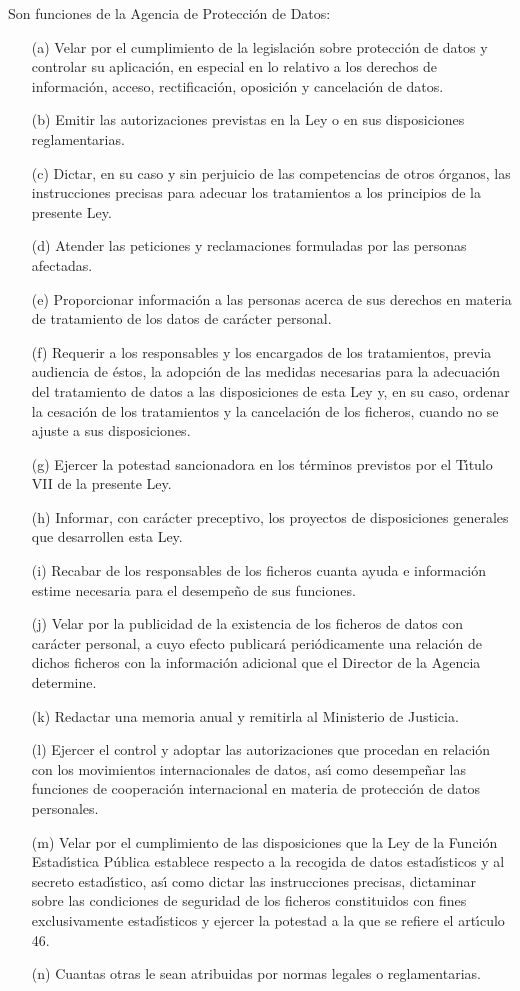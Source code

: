 Son funciones de la Agencia de Protecci\'on de Datos:
\begin{itemize}
\item [(a)] Velar por el cumplimiento de la legislaci\'on sobre protecci\'on de 
datos y controlar su aplicaci\'on, en especial en lo relativo a los derechos de 
informaci\'on, acceso, rectificaci\'on, oposici\'on y cancelaci\'on de datos.
\item [(b)] Emitir las autorizaciones previstas en la Ley o en sus disposiciones
reglamentarias.
\item [(c)] Dictar, en su caso y sin perjuicio de las competencias de otros 
\'organos, las instrucciones precisas para adecuar los tratamientos a los 
principios de la presente Ley.
\item [(d)] Atender las peticiones y reclamaciones formuladas por las personas 
afectadas.
\item [(e)] Proporcionar informaci\'on a las personas acerca de sus derechos en 
materia de tratamiento de los datos de car\'acter personal.
\item [(f)] Requerir a los responsables y los encargados de los tratamientos, 
previa audiencia de \'estos, la adopci\'on de las medidas necesarias para la 
adecuaci\'on del tratamiento de datos a las disposiciones de esta Ley y, en su 
caso, ordenar la cesaci\'on de los tratamientos y la cancelaci\'on de los 
ficheros, cuando no se ajuste a sus disposiciones.
\item [(g)] Ejercer la potestad sancionadora en los t\'erminos previstos por el 
T\'{\i}tulo VII de la presente Ley.
\item [(h)] Informar, con car\'acter preceptivo, los proyectos de disposiciones 
generales que desarrollen esta Ley.
\item [(i)] Recabar de los responsables de los ficheros cuanta ayuda e 
informaci\'on estime necesaria para el desempe\~no de sus funciones.
\item [(j)] Velar por la publicidad de la existencia de los ficheros de datos 
con car\'acter personal, a cuyo efecto publicar\'a peri\'odicamente una 
relaci\'on de dichos ficheros con la informaci\'on adicional que el Director de 
la Agencia determine.
\item [(k)] Redactar una memoria anual y remitirla al Ministerio de Justicia.
\item [(l)] Ejercer el control y adoptar las autorizaciones que procedan en 
relaci\'on con los movimientos internacionales de datos, as\'{\i} como 
desempe\~nar las funciones de cooperaci\'on internacional en materia de 
protecci\'on de datos personales.
\item [(m)] Velar por el cumplimiento de las disposiciones que la Ley de la 
Funci\'on Estad\'{\i}stica P\'ublica establece respecto a la recogida de datos 
estad\'{\i}sticos y al secreto estad\'{\i}stico, as\'{\i} como dictar las 
instrucciones precisas, dictaminar sobre las condiciones de seguridad de los 
ficheros constituidos con fines exclusivamente estad\'{\i}sticos y ejercer la 
potestad a la que se refiere el art\'{\i}culo 46.
\item [(n)] Cuantas otras le sean atribuidas por normas legales o 
reglamentarias.
\end{itemize}
